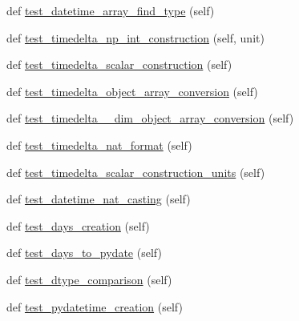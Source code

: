 \begin{DoxyCompactItemize}
\item 
def \hyperlink{classnumpy_1_1core_1_1tests_1_1test__datetime_1_1TestDateTime_a71df8926196db125b00ec67cd48c8ad6}{test\+\_\+datetime\+\_\+array\+\_\+find\+\_\+type} (self)
\item 
def \hyperlink{classnumpy_1_1core_1_1tests_1_1test__datetime_1_1TestDateTime_ab548954bd62ffadee570ed54641f8f7d}{test\+\_\+timedelta\+\_\+np\+\_\+int\+\_\+construction} (self, unit)
\item 
def \hyperlink{classnumpy_1_1core_1_1tests_1_1test__datetime_1_1TestDateTime_a1ed20453f4d865765822e9c1faaf8212}{test\+\_\+timedelta\+\_\+scalar\+\_\+construction} (self)
\item 
def \hyperlink{classnumpy_1_1core_1_1tests_1_1test__datetime_1_1TestDateTime_abe50385c1657cc6bdeb442c79b3703f1}{test\+\_\+timedelta\+\_\+object\+\_\+array\+\_\+conversion} (self)
\item 
def \hyperlink{classnumpy_1_1core_1_1tests_1_1test__datetime_1_1TestDateTime_ad51245de7be9af0cc6dbaa3ffeaa15ab}{test\+\_\+timedelta\+\_\+\_\+dim\+\_\+object\+\_\+array\+\_\+conversion} (self)
\item 
def \hyperlink{classnumpy_1_1core_1_1tests_1_1test__datetime_1_1TestDateTime_afff01ca766e9ef7822450733c2b7b180}{test\+\_\+timedelta\+\_\+nat\+\_\+format} (self)
\item 
def \hyperlink{classnumpy_1_1core_1_1tests_1_1test__datetime_1_1TestDateTime_a396e8c9237e1dbe4f68f78c0b775568b}{test\+\_\+timedelta\+\_\+scalar\+\_\+construction\+\_\+units} (self)
\item 
def \hyperlink{classnumpy_1_1core_1_1tests_1_1test__datetime_1_1TestDateTime_ace84fd215c6a0749080c1cca6eb3ca03}{test\+\_\+datetime\+\_\+nat\+\_\+casting} (self)
\item 
def \hyperlink{classnumpy_1_1core_1_1tests_1_1test__datetime_1_1TestDateTime_aa59af8e4112503447721783b841a1a4a}{test\+\_\+days\+\_\+creation} (self)
\item 
def \hyperlink{classnumpy_1_1core_1_1tests_1_1test__datetime_1_1TestDateTime_a4b74e2e15b33c629de8a9fabe08d9c2d}{test\+\_\+days\+\_\+to\+\_\+pydate} (self)
\item 
def \hyperlink{classnumpy_1_1core_1_1tests_1_1test__datetime_1_1TestDateTime_a19c66c19dc5f1aff75f29e53660d0281}{test\+\_\+dtype\+\_\+comparison} (self)
\item 
def \hyperlink{classnumpy_1_1core_1_1tests_1_1test__datetime_1_1TestDateTime_ab8a2d7b56869bfd59e8304362d984645}{test\+\_\+pydatetime\+\_\+creation} (self)
\item 

\end{DoxyCompactItemize}
